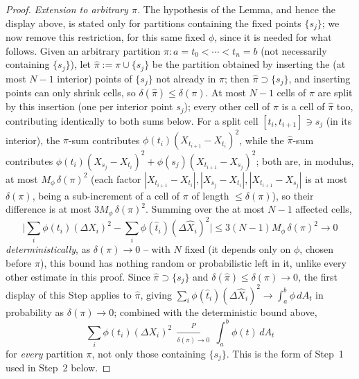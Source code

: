\documentclass[10pt,a4paper]{amsart}
\begin{document}
\begin{proof}
\smallskip\noindent\emph{Extension to arbitrary $\pi$.} The hypothesis
of the Lemma, and hence the display above, is stated only for partitions
containing the fixed points $\{s_j\}$; we now remove this restriction,
for this same fixed $\phi$, since it is needed for what follows. Given
an arbitrary partition $\pi\colon a=t_0<\cdots<t_n=b$ (not necessarily
containing $\{s_j\}$), let $\widehat\pi:=\pi\cup\{s_j\}$ be the partition
obtained by inserting the (at most $N-1$ interior) points of $\{s_j\}$
not already in $\pi$; then $\widehat\pi\supset\{s_j\}$, and inserting
points can only shrink cells, so $\delta(\widehat\pi)\le\delta(\pi)$.
At most $N-1$ cells of $\pi$ are split by this insertion (one per
interior point $s_j$); every other cell of $\pi$ is a cell of
$\widehat\pi$ too, contributing identically to both sums below.
For a split cell $[t_i,t_{i+1}]\ni s_j$ (in its interior), the
$\pi$-sum contributes $\phi(t_i)(X_{t_{i+1}}-X_{t_i})^2$, while the
$\widehat\pi$-sum contributes
$\phi(t_i)(X_{s_j}-X_{t_i})^2+\phi(s_j)(X_{t_{i+1}}-X_{s_j})^2$; both
are, in modulus, at most $M_\phi\,\delta(\pi)^2$ (each factor
$|X_{t_{i+1}}-X_{t_i}|,|X_{s_j}-X_{t_i}|,|X_{t_{i+1}}-X_{s_j}|$ is at
most $\delta(\pi)$, being a sub-increment of a cell of $\pi$ of length
$\le\delta(\pi)$), so their difference is at most $3M_\phi\,\delta(\pi)^2$.
Summing over the at most $N-1$ affected cells,
\[
\Big|\sum_i\phi(t_i)(\Delta X_i)^2-\sum_i\phi(\hat t_i)(\Delta\widehat
X_i)^2\Big|\le3(N-1)M_\phi\,\delta(\pi)^2\longrightarrow0
\]
\emph{deterministically}, as $\delta(\pi)\to0$ -- with $N$ fixed (it
depends only on $\phi$, chosen before $\pi$), this bound has nothing
random or probabilistic left in it, unlike every other estimate in this
proof. Since $\widehat\pi\supset\{s_j\}$ and
$\delta(\widehat\pi)\le\delta(\pi)\to0$, the first display of this Step
applies to $\widehat\pi$, giving
$\sum_i\phi(\hat t_i)(\Delta\widehat X_i)^2\to\int_a^b\phi\,dA_t$ in
probability as $\delta(\pi)\to0$; combined with the deterministic bound
above,
\[
\sum_i\phi(t_i)(\Delta X_i)^2\ \xrightarrow[\delta(\pi)\to0]{P}\
\int_a^b\phi(t)\,dA_t
\]
for \emph{every} partition $\pi$, not only those containing $\{s_j\}$.
This is the form of Step~1 used in Step~2 below.


\end{proof}
\end{document}
